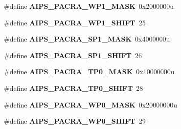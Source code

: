 \begin{DoxyCompactItemize}
\item 
\hypertarget{group___a_i_p_s___register___masks_ga3e1d1ddbb4f1a72e4161ff3a3947fd37}{}\#define {\bfseries A\+I\+P\+S\+\_\+\+P\+A\+C\+R\+A\+\_\+\+W\+P1\+\_\+\+M\+A\+S\+K}~0x2000000u\label{group___a_i_p_s___register___masks_ga3e1d1ddbb4f1a72e4161ff3a3947fd37}

\item 
\hypertarget{group___a_i_p_s___register___masks_ga4de52ee500d270b40469284b847ad104}{}\#define {\bfseries A\+I\+P\+S\+\_\+\+P\+A\+C\+R\+A\+\_\+\+W\+P1\+\_\+\+S\+H\+I\+F\+T}~25\label{group___a_i_p_s___register___masks_ga4de52ee500d270b40469284b847ad104}

\item 
\hypertarget{group___a_i_p_s___register___masks_ga2dd11dbd526cf34cbe3115f557488787}{}\#define {\bfseries A\+I\+P\+S\+\_\+\+P\+A\+C\+R\+A\+\_\+\+S\+P1\+\_\+\+M\+A\+S\+K}~0x4000000u\label{group___a_i_p_s___register___masks_ga2dd11dbd526cf34cbe3115f557488787}

\item 
\hypertarget{group___a_i_p_s___register___masks_ga6277f8f693688829febd2a5445672be7}{}\#define {\bfseries A\+I\+P\+S\+\_\+\+P\+A\+C\+R\+A\+\_\+\+S\+P1\+\_\+\+S\+H\+I\+F\+T}~26\label{group___a_i_p_s___register___masks_ga6277f8f693688829febd2a5445672be7}

\item 
\hypertarget{group___a_i_p_s___register___masks_ga8e60cecb13c7963ae381bd9f4a0c9aa7}{}\#define {\bfseries A\+I\+P\+S\+\_\+\+P\+A\+C\+R\+A\+\_\+\+T\+P0\+\_\+\+M\+A\+S\+K}~0x10000000u\label{group___a_i_p_s___register___masks_ga8e60cecb13c7963ae381bd9f4a0c9aa7}

\item 
\hypertarget{group___a_i_p_s___register___masks_ga14b0fbe8a5d4d3c2c687090698f4d307}{}\#define {\bfseries A\+I\+P\+S\+\_\+\+P\+A\+C\+R\+A\+\_\+\+T\+P0\+\_\+\+S\+H\+I\+F\+T}~28\label{group___a_i_p_s___register___masks_ga14b0fbe8a5d4d3c2c687090698f4d307}

\item 
\hypertarget{group___a_i_p_s___register___masks_gab0dbe95e59c91126a667fc20a0d1f061}{}\#define {\bfseries A\+I\+P\+S\+\_\+\+P\+A\+C\+R\+A\+\_\+\+W\+P0\+\_\+\+M\+A\+S\+K}~0x20000000u\label{group___a_i_p_s___register___masks_gab0dbe95e59c91126a667fc20a0d1f061}

\item 
\hypertarget{group___a_i_p_s___register___masks_ga452355a55a160bcfb7e17f060569d0b8}{}\#define {\bfseries A\+I\+P\+S\+\_\+\+P\+A\+C\+R\+A\+\_\+\+W\+P0\+\_\+\+S\+H\+I\+F\+T}~29\label{group___a_i_p_s___register___masks_ga452355a55a160bcfb7e17f060569d0b8}


\end{DoxyCompactItemize}
